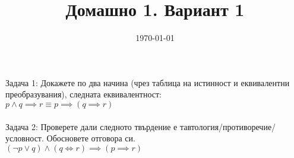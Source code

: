 \documentclass{article}
\begin{document}
     
\title{Домашно 1. Вариант 1}
\date{\today}
\maketitle
    
Задача 1: Докажете по два начина (чрез таблица на истинност и еквивалентни преобразувания), следната еквивалентност: \\

$ p \land q \implies r \equiv p \implies (q \implies r) $ \\\\

Задача 2: Проверете дали следното твърдение е тавтология/противоречие/условност. Обосновете отговора си. \\

$ (\lnot p \lor q) \land (q \iff r) \implies (p \implies r) $
\end{document}
